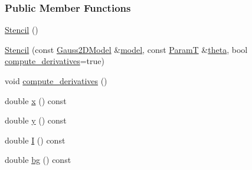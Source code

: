 \subsubsection*{Public Member Functions}
\begin{DoxyCompactItemize}
\item 
\hyperlink{classmappel_1_1Gauss2DModel_1_1Stencil_a75a827ef8312a7ce445c83aebf93204f}{Stencil} ()
\item 
\hyperlink{classmappel_1_1Gauss2DModel_1_1Stencil_a9e1f0ff585b5394d2d114a432b8c7d94}{Stencil} (const \hyperlink{classmappel_1_1Gauss2DModel}{Gauss2\+D\+Model} \&\hyperlink{classmappel_1_1Gauss2DModel_1_1Stencil_ac5ae33e358a883887bccedc8a485bca7}{model}, const \hyperlink{classmappel_1_1Gauss2DModel_1_1Stencil_af4899fe2829b3bf1c685cd6bfd1b602e}{ParamT} \&\hyperlink{classmappel_1_1Gauss2DModel_1_1Stencil_ac9ce60b33fe2235ebbb80dd9d90a49ad}{theta}, bool \hyperlink{classmappel_1_1Gauss2DModel_1_1Stencil_aa454ad18859be0dcc48f5de8982c7ba7}{compute\+\_\+derivatives}=true)
\item 
void \hyperlink{classmappel_1_1Gauss2DModel_1_1Stencil_aa454ad18859be0dcc48f5de8982c7ba7}{compute\+\_\+derivatives} ()
\item 
double \hyperlink{classmappel_1_1Gauss2DModel_1_1Stencil_a01755bf64c87675ddd69958e65eb0bc3}{x} () const 
\item 
double \hyperlink{classmappel_1_1Gauss2DModel_1_1Stencil_a3c130702adb8ce884c35eef9bb4d510f}{y} () const 
\item 
double \hyperlink{classmappel_1_1Gauss2DModel_1_1Stencil_aac7254dbe4ed3e2dd928ab29779f570d}{I} () const 
\item 
double \hyperlink{classmappel_1_1Gauss2DModel_1_1Stencil_a1e6bea9d029ad5ff367e988a5af24101}{bg} () const 
\end{DoxyCompactItemize}
